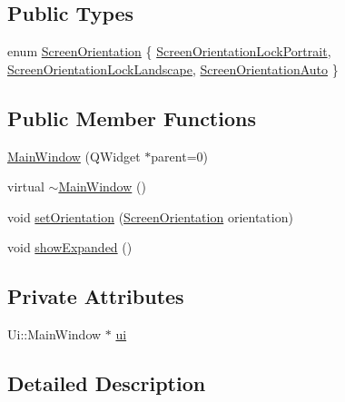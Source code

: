 \subsection*{Public Types}
\begin{DoxyCompactItemize}
\item 
enum \hyperlink{class_main_window_abd5f153be5c4988dbc35ae7c1f25d903}{Screen\-Orientation} \{ \hyperlink{class_main_window_abd5f153be5c4988dbc35ae7c1f25d903a13a4781d324c19835f8673230efc7b3d}{Screen\-Orientation\-Lock\-Portrait}, 
\hyperlink{class_main_window_abd5f153be5c4988dbc35ae7c1f25d903ad17797d910e72ac4ae7fd7c88ee43224}{Screen\-Orientation\-Lock\-Landscape}, 
\hyperlink{class_main_window_abd5f153be5c4988dbc35ae7c1f25d903ac6b5fe3ca97c62b5c9c5c55edb09027d}{Screen\-Orientation\-Auto}
 \}
\end{DoxyCompactItemize}
\subsection*{Public Member Functions}
\begin{DoxyCompactItemize}
\item 
\hyperlink{class_main_window_a8b244be8b7b7db1b08de2a2acb9409db}{Main\-Window} (Q\-Widget $\ast$parent=0)
\item 
virtual \hyperlink{class_main_window_ae98d00a93bc118200eeef9f9bba1dba7}{$\sim$\-Main\-Window} ()
\item 
void \hyperlink{class_main_window_a9597b97cef9da0760a06e8e04ca3d138}{set\-Orientation} (\hyperlink{class_main_window_abd5f153be5c4988dbc35ae7c1f25d903}{Screen\-Orientation} orientation)
\item 
void \hyperlink{class_main_window_ae66038a9d909fd409d781bf7c3f3ff2c}{show\-Expanded} ()
\end{DoxyCompactItemize}
\subsection*{Private Attributes}
\begin{DoxyCompactItemize}
\item 
Ui\-::\-Main\-Window $\ast$ \hyperlink{class_main_window_a35466a70ed47252a0191168126a352a5}{ui}
\end{DoxyCompactItemize}


\subsection{Detailed Description}


